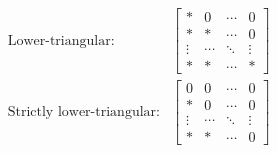 \begin{dfn}{}{}
\begin{rmk}
\begin{subequations}
\begin{align}
			\text{Lower-triangular:} & \begin{bmatrix}* & 0 & \cdots & 0 \\ * & * & \cdots & 0 \\ \vdots & \cdots & \ddots & \vdots \\ * & * & \cdots & *\end{bmatrix} \\
			\text{Strictly lower-triangular:} & \begin{bmatrix}0 & 0 & \cdots & 0 \\ * & 0 & \cdots & 0 \\ \vdots & \cdots & \ddots & \vdots \\ * & * & \cdots & 0\end{bmatrix}
			\end{align}
		\end{subequations}
	\end{rmk}
\end{dfn}

